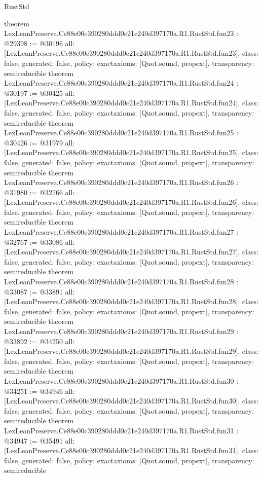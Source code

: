 \begin{lexlean}{RustStd}
\begin{coremodule}
{}
theorem LexLeanPreserve.Ce88e00c390280ddd0c21e240d397170a.R1.RustStd.fun23 : @29398 := @30196 {
  all: [LexLeanPreserve.Ce88e00c390280ddd0c21e240d397170a.R1.RustStd.fun23],
  class: false,
  generated: false,
  policy: exact{axioms: [Quot.sound, propext]},
  transparency: semireducible
}
theorem LexLeanPreserve.Ce88e00c390280ddd0c21e240d397170a.R1.RustStd.fun24 : @30197 := @30425 {
  all: [LexLeanPreserve.Ce88e00c390280ddd0c21e240d397170a.R1.RustStd.fun24],
  class: false,
  generated: false,
  policy: exact{axioms: [Quot.sound, propext]},
  transparency: semireducible
}
theorem LexLeanPreserve.Ce88e00c390280ddd0c21e240d397170a.R1.RustStd.fun25 : @30426 := @31979 {
  all: [LexLeanPreserve.Ce88e00c390280ddd0c21e240d397170a.R1.RustStd.fun25],
  class: false,
  generated: false,
  policy: exact{axioms: [Quot.sound, propext]},
  transparency: semireducible
}
theorem LexLeanPreserve.Ce88e00c390280ddd0c21e240d397170a.R1.RustStd.fun26 : @31980 := @32766 {
  all: [LexLeanPreserve.Ce88e00c390280ddd0c21e240d397170a.R1.RustStd.fun26],
  class: false,
  generated: false,
  policy: exact{axioms: [Quot.sound, propext]},
  transparency: semireducible
}
theorem LexLeanPreserve.Ce88e00c390280ddd0c21e240d397170a.R1.RustStd.fun27 : @32767 := @33086 {
  all: [LexLeanPreserve.Ce88e00c390280ddd0c21e240d397170a.R1.RustStd.fun27],
  class: false,
  generated: false,
  policy: exact{axioms: [Quot.sound, propext]},
  transparency: semireducible
}
theorem LexLeanPreserve.Ce88e00c390280ddd0c21e240d397170a.R1.RustStd.fun28 : @33087 := @33891 {
  all: [LexLeanPreserve.Ce88e00c390280ddd0c21e240d397170a.R1.RustStd.fun28],
  class: false,
  generated: false,
  policy: exact{axioms: [Quot.sound, propext]},
  transparency: semireducible
}
theorem LexLeanPreserve.Ce88e00c390280ddd0c21e240d397170a.R1.RustStd.fun29 : @33892 := @34250 {
  all: [LexLeanPreserve.Ce88e00c390280ddd0c21e240d397170a.R1.RustStd.fun29],
  class: false,
  generated: false,
  policy: exact{axioms: [Quot.sound, propext]},
  transparency: semireducible
}
theorem LexLeanPreserve.Ce88e00c390280ddd0c21e240d397170a.R1.RustStd.fun30 : @34251 := @34946 {
  all: [LexLeanPreserve.Ce88e00c390280ddd0c21e240d397170a.R1.RustStd.fun30],
  class: false,
  generated: false,
  policy: exact{axioms: [Quot.sound, propext]},
  transparency: semireducible
}
theorem LexLeanPreserve.Ce88e00c390280ddd0c21e240d397170a.R1.RustStd.fun31 : @34947 := @35491 {
  all: [LexLeanPreserve.Ce88e00c390280ddd0c21e240d397170a.R1.RustStd.fun31],
  class: false,
  generated: false,
  policy: exact{axioms: [Quot.sound, propext]},
  transparency: semireducible
}
\end{coremodule}
\end{lexlean}
